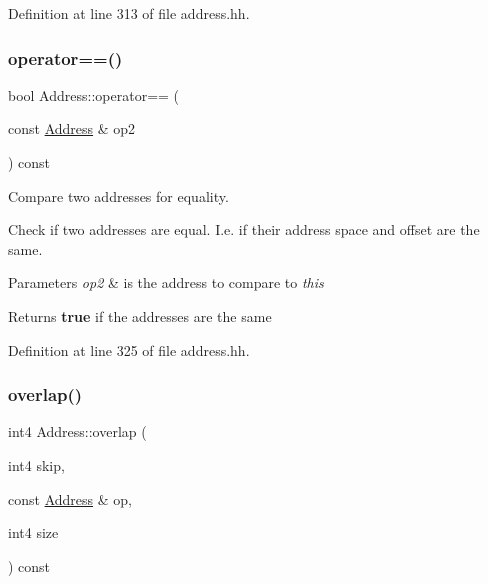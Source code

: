 Definition at line 313 of file address.\+hh.

\mbox{\label{class_address_a6f61edd53efcd9ff5d7f067fb46250dd}} 
\subsubsection{\texorpdfstring{operator==()}{operator==()}}
{\footnotesize\ttfamily bool Address\+::operator== (\begin{DoxyParamCaption}\item[{const \mbox{\hyperlink{class_address}{Address}} \&}]{op2 }\end{DoxyParamCaption}) const\hspace{0.3cm}{\ttfamily [inline]}}



Compare two addresses for equality. 

Check if two addresses are equal. I.\+e. if their address space and offset are the same. 
\begin{DoxyParams}{Parameters}
{\em op2} & is the address to compare to {\itshape this} \\
\hline
\end{DoxyParams}
\begin{DoxyReturn}{Returns}
{\bfseries{true}} if the addresses are the same 
\end{DoxyReturn}


Definition at line 325 of file address.\+hh.

\mbox{\label{class_address_af63d859f7cdbe890e9ca2fd2812f616c}} 
\subsubsection{\texorpdfstring{overlap()}{overlap()}}
{\footnotesize\ttfamily int4 Address\+::overlap (\begin{DoxyParamCaption}\item[{int4}]{skip,  }\item[{const \mbox{\hyperlink{class_address}{Address}} \&}]{op,  }\item[{int4}]{size }\end{DoxyParamCaption}) const}



